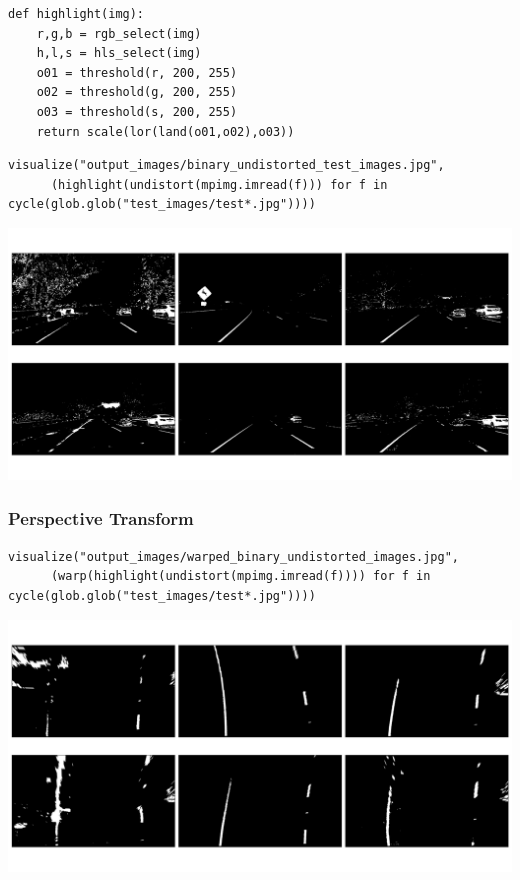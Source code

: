 \documentclass[11pt]{article}
\begin{document}
\begin{verbatim}
def highlight(img):
    r,g,b = rgb_select(img)
    h,l,s = hls_select(img)
    o01 = threshold(r, 200, 255)
    o02 = threshold(g, 200, 255)
    o03 = threshold(s, 200, 255)
    return scale(lor(land(o01,o02),o03))
\end{verbatim}

\begin{verbatim}
visualize("output_images/binary_undistorted_test_images.jpg",
	  (highlight(undistort(mpimg.imread(f))) for f in cycle(glob.glob("test_images/test*.jpg"))))
\end{verbatim}

\includegraphics[width=.9\linewidth]{output_images/binary_undistorted_test_images.jpg}

\subsubsection*{Perspective Transform}
\label{sec-2-3-2}

\begin{verbatim}
visualize("output_images/warped_binary_undistorted_images.jpg",
	  (warp(highlight(undistort(mpimg.imread(f)))) for f in cycle(glob.glob("test_images/test*.jpg"))))
\end{verbatim}

\includegraphics[width=.9\linewidth]{output_images/warped_binary_undistorted_images.jpg}
\end{document}
